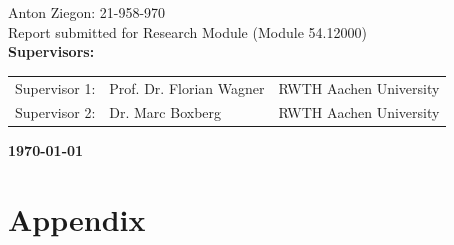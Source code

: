 \documentclass[11pt]{article}%
\begin{document}
\begin{titlepage}
\begin{center}
{Anton Ziegon: 21-958-970} \\[20mm]
{Report submitted for Research Module (Module 54.12000)} \\[20mm]


\textbf{Supervisors:}\\[5mm]
\begin{tabular}{lll}

Supervisor 1: & Prof. Dr. Florian Wagner & RWTH Aachen University\\
Supervisor 2: & Dr. Marc Boxberg & RWTH Aachen University\\[20mm]

\end{tabular}
\end{center}

\begin{center}
   \Large\textbf{\today} 
\end{center}
\end{titlepage}

\newpage




\newpage







\newpage
\printbibliography


\newpage
\appendix
\section{Appendix}
\setcounter{figure}{0}
\setcounter{table}{0}
\renewcommand{\thetable}{A\arabic{table}}


\newpage

%
%


%
\end{document}
